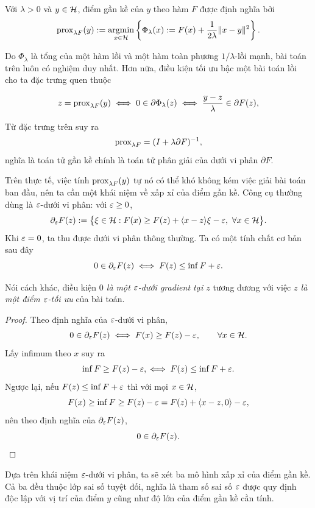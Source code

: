 \begin{definition}
Với $\lambda>0$ và $y\in\mathcal{H}$, điểm gần kề của $y$ theo hàm $F$ được định nghĩa bởi
\begin{equation}
    \operatorname{prox}_{\lambda F}(y)
    :=
    \operatorname*{argmin}_{x\in\mathcal{H}}
    \left\{
    \Phi_\lambda(x)
    :=
    F(x)
    +
    \frac1{2\lambda}\lVert x-y\rVert^2
    \right\}.
\end{equation}
\end{definition}

\begin{essayonly}
Do $\Phi_\lambda$ là tổng của một hàm lồi và một hàm toàn phương $1/\lambda$-lồi mạnh, bài toán trên luôn có nghiệm duy nhất. Hơn nữa, điều kiện tối ưu bậc một bài toán lồi cho ta đặc trưng quen thuộc
\end{essayonly}
\begin{equation}
  z = \operatorname{prox}_{\lambda F}(y)
  \iff 0 \in \partial \Phi_\lambda(z)
  \iff \frac{y-z}{\lambda} \in \partial F(z),
  \label{eq:opt-cond}
\end{equation}
\begin{essayonly}
Từ đặc trưng trên suy ra $$\operatorname{prox}_{\lambda F}=(I+\lambda\partial F)^{-1},$$ nghĩa là toán tử gần kề chính là toán tử phân giải của dưới vi phân $\partial F$.
\end{essayonly}
Trên thực tế, việc tính $\operatorname{prox}_{\lambda F}(y)$ tự nó có thể khó không kém việc giải bài toán ban đầu, nên ta cần một khái niệm về xấp xỉ của điểm gần kề. Công cụ thường dùng là $\varepsilon$-dưới vi phân: với $\varepsilon\ge 0$,
\begin{equation}
  \partial_\varepsilon F(z) := \big\{ \xi\in\mathcal{H} :
     F(x) \ge F(z) + \langle x-z\rangle{\xi} - \varepsilon,\ \forall x\in\mathcal{H} \big\}.
  \label{eq:eps-subdiff}
\end{equation}
Khi $\varepsilon=0$, ta thu được dưới vi phân thông thường. Ta có một tính chất cơ bản sau đây
\begin{equation}
  0\in\partial_\varepsilon F(z)
  \iff
  F(z)\le\inf F+\varepsilon.
  \label{eq:eps-subopt}
\end{equation}
\begin{essayonly}
Nói cách khác, điều kiện \textit{$0$ là một $\varepsilon$-dưới gradient tại $z$} tương đương với việc \textit{$z$ là một điểm $\varepsilon$-tối ưu} của bài toán.
\begin{proof}
Theo định nghĩa của $\varepsilon$-dưới vi phân,
\[
0\in\partial_\varepsilon F(z)
\iff
F(x)\ge F(z)-\varepsilon,\qquad\forall x\in\mathcal{H}.
\]
Lấy infimum theo $x$ suy ra
\[
\inf F\ge F(z)-\varepsilon,
\iff
F(z)\le\inf F+\varepsilon.
\]
Ngược lại, nếu $F(z)\le\inf F+\varepsilon$ thì với mọi $x\in\mathcal{H}$,
\[
F(x)\ge\inf F\ge F(z)-\varepsilon
=
F(z)+\langle x-z,0\rangle-\varepsilon,
\]
nên theo định nghĩa của $\partial_\varepsilon F(z)$,
\[
0\in\partial_\varepsilon F(z).
\]
\end{proof}
\end{essayonly}

\begin{essayonly}
Dựa trên khái niệm $\varepsilon$-dưới vi phân, ta sẽ xét ba mô hình xấp xỉ của điểm gần kề. Cả ba đều thuộc lớp sai số tuyệt đối, nghĩa là tham số sai số $\varepsilon$ được quy định độc lập với vị trí của điểm $y$ cũng như độ lớn của điểm gần kề cần tính.
\end{essayonly}

